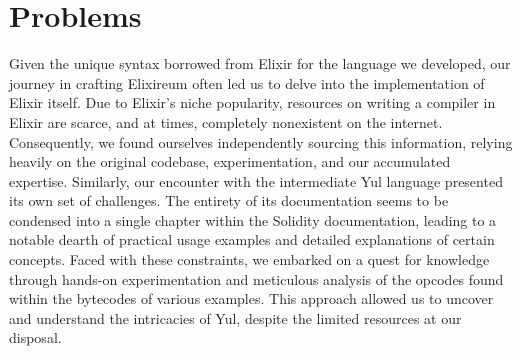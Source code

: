 




\section{Problems}
\label{sec:problems}

Given the unique syntax borrowed from Elixir for the language we developed, our journey in crafting Elixireum often led us to delve into the implementation of Elixir itself. Due to Elixir's niche popularity, resources on writing a compiler in Elixir are scarce, and at times, completely nonexistent on the internet. Consequently, we found ourselves independently sourcing this information, relying heavily on the original codebase, experimentation, and our accumulated expertise.
Similarly, our encounter with the intermediate Yul language presented its own set of challenges. The entirety of its documentation seems to be condensed into a single chapter within the Solidity documentation, leading to a notable dearth of practical usage examples and detailed explanations of certain concepts. Faced with these constraints, we embarked on a quest for knowledge through hands-on experimentation and meticulous analysis of the opcodes found within the bytecodes of various examples. This approach allowed us to uncover and understand the intricacies of Yul, despite the limited resources at our disposal.

